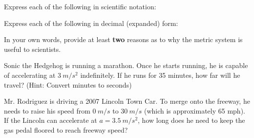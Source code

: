 \begin{questions}
\qsp 

\question[2] Express each of the following in scientific notation:


\qsp

\question[2] Express each of the following in decimal (expanded) form:

\qsp
\question[2] In your own words, provide at least \textbf{two} reasons as to why the metric system is useful to scientists.  

\qspp

\newpage
{}


\question[3] Sonic the Hedgehog is running a marathon. Once he starts running, he is capable of accelerating at $\SI{3}{m/s^2}$ indefinitely. If he runs for 35 minutes, how far will he travel? (Hint: Convert minutes to seconds)

\qspppp

\question[3] Mr. Rodriguez is driving a 2007 Lincoln Town Car. To merge onto the freeway, he needs to raise his speed from $\SI{0}{m/s}$ to $\SI{30}{m/s}$ (which is approximately 65 mph). If the Lincoln can accelerate at $a=\SI{3.5}{m/s^2}$, how long does he need to keep the gas pedal floored to reach freeway speed?


\end{questions}
